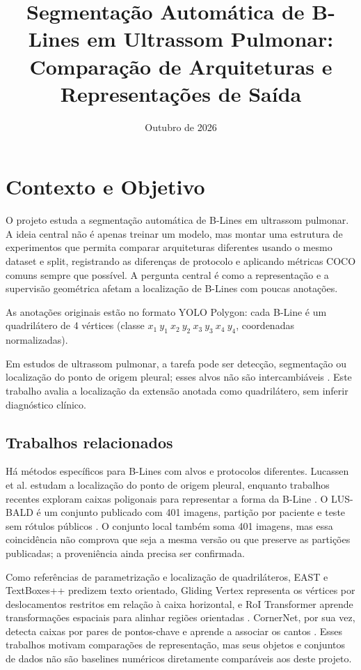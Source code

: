 \documentclass[11pt]{article}
\title{Segmentação Automática de B-Lines em Ultrassom Pulmonar: \\
Comparação de Arquiteturas e Representações de Saída}
\author{}
\date{Outubro de 2026}
\begin{document}
\maketitle

\section{Contexto e Objetivo}

O projeto estuda a segmentação automática de B-Lines em ultrassom pulmonar. A ideia
central não é apenas treinar um modelo, mas montar uma estrutura de experimentos que
permita comparar arquiteturas diferentes usando o mesmo dataset e split, registrando
as diferenças de protocolo e aplicando métricas COCO comuns sempre que possível. A
pergunta central é como a representação e a supervisão geométrica afetam a
localização de B-Lines com poucas anotações.

As anotações originais estão no formato YOLO Polygon: cada B-Line é um quadrilátero
de 4 vértices (classe $x_1\ y_1\ x_2\ y_2\ x_3\ y_3\ x_4\ y_4$, coordenadas
normalizadas).

Em estudos de ultrassom pulmonar, a tarefa pode ser detecção, segmentação ou
localização do ponto de origem pleural; esses alvos não são intercambiáveis
\cite{lucassen2023}. Este trabalho avalia a localização da extensão anotada como
quadrilátero, sem inferir diagnóstico clínico.

\subsection{Trabalhos relacionados}

Há métodos específicos para B-Lines com alvos e protocolos diferentes. Lucassen et
al. estudam a localização do ponto de origem pleural, enquanto trabalhos recentes
exploram caixas poligonais para representar a forma da B-Line
\cite{lucassen2023,nabawanuka2025}. O LUS-BALD é um conjunto publicado com 401
imagens, partição por paciente e teste sem rótulos públicos \cite{lusbald2025}.
O conjunto local também soma 401 imagens, mas essa coincidência não comprova que
seja a mesma versão ou que preserve as partições publicadas; a proveniência ainda
precisa ser confirmada.

Como referências de parametrização e localização de quadriláteros, EAST e
TextBoxes++ predizem texto orientado, Gliding Vertex representa os vértices por
deslocamentos restritos em relação à caixa horizontal, e RoI Transformer aprende
transformações espaciais para alinhar regiões orientadas
\cite{zhou2017east,liao2018textboxes,xu2020gliding,ding2019roi}. CornerNet, por
sua vez, detecta caixas por pares de pontos-chave e aprende a associar os cantos
\cite{law2018cornernet}. Esses trabalhos motivam comparações de representação,
mas seus objetos e conjuntos de dados não são baselines numéricos diretamente
comparáveis aos deste projeto.
\end{document}
